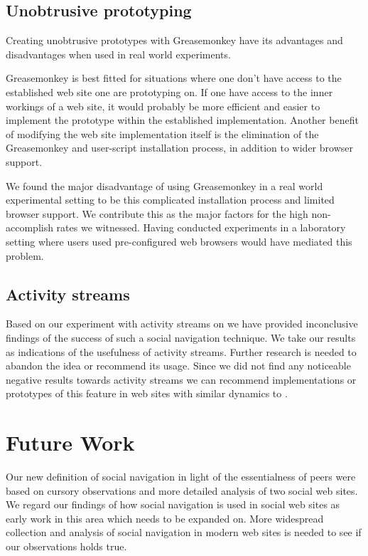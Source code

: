 \subsection{Unobtrusive prototyping}

Creating unobtrusive prototypes with Greasemonkey have its advantages and
disadvantages when used in real world experiments.

Greasemonkey is best fitted for situations where one don't have access to the
established web site one are prototyping on. If one have access to the inner
workings of a web site, it would probably be more efficient and easier to
implement the prototype within the established implementation. Another benefit
of modifying the web site implementation itself is the elimination of the
Greasemonkey and user-script installation process, in addition to wider
browser support.

We found the major disadvantage of using Greasemonkey in a real world
experimental setting to be this complicated installation process and limited
browser support. We contribute this as the major factors for the high
non-accomplish rates we witnessed. Having conducted experiments in a
laboratory setting where users used pre-configured web browsers would have
mediated this problem.

\subsection{Activity streams}

Based on our experiment with activity streams on \urort{} we have provided
inconclusive findings of the success of such a social navigation technique.
We take our results as indications of the usefulness of activity streams.
Further research is needed to abandon the idea or recommend its usage.
Since we did not find any noticeable negative results towards activity streams
we can recommend implementations or prototypes of this feature in web sites
with similar dynamics to \urort{}.

\section{Future Work}

Our new definition of social navigation in light of the essentialness of peers
were based on cursory observations and more detailed analysis of two social
web sites. We regard our findings of how social navigation is used in social
web sites as early work in this area which needs to be expanded on. More
widespread collection and analysis of social navigation in modern web sites is
needed to see if our observations holds true.

